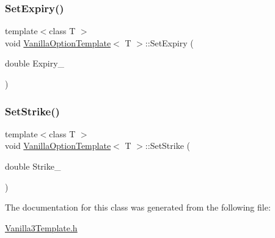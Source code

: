 \hypertarget{classVanillaOptionTemplate_abb063fb080d0fda77233f370991c941e}{}\label{classVanillaOptionTemplate_abb063fb080d0fda77233f370991c941e} 
\subsubsection{\texorpdfstring{Set\+Expiry()}{SetExpiry()}}
{\footnotesize\ttfamily template$<$class T $>$ \\
void \hyperlink{classVanillaOptionTemplate}{Vanilla\+Option\+Template}$<$ T $>$\+::Set\+Expiry (\begin{DoxyParamCaption}\item[{double}]{Expiry\+\_\+ }\end{DoxyParamCaption})}

\hypertarget{classVanillaOptionTemplate_abb71fbe2909498c8bdf5ae49c6cc73e0}{}\label{classVanillaOptionTemplate_abb71fbe2909498c8bdf5ae49c6cc73e0} 
\subsubsection{\texorpdfstring{Set\+Strike()}{SetStrike()}}
{\footnotesize\ttfamily template$<$class T $>$ \\
void \hyperlink{classVanillaOptionTemplate}{Vanilla\+Option\+Template}$<$ T $>$\+::Set\+Strike (\begin{DoxyParamCaption}\item[{double}]{Strike\+\_\+ }\end{DoxyParamCaption})}



The documentation for this class was generated from the following file\+:\begin{DoxyCompactItemize}
\item 
\hyperlink{Vanilla3Template_8h}{Vanilla3\+Template.\+h}\end{DoxyCompactItemize}
